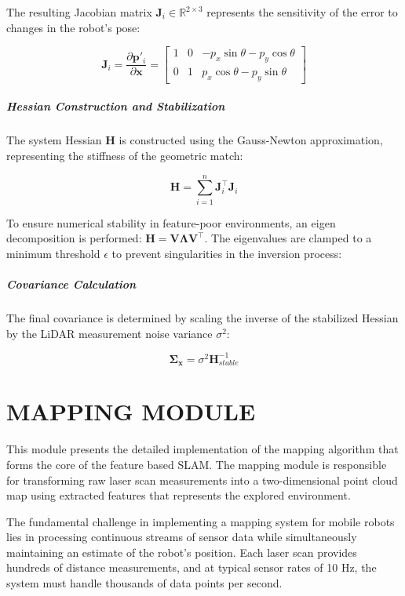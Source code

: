 \documentclass[11pt]{article}
\begin{document}
The resulting Jacobian matrix $\mathbf{J}_i \in \mathbb{R}^{2 \times 3}$ represents the sensitivity of the error to changes in the robot's pose:

\begin{equation}
	\mathbf{J}_i = \frac{\partial \mathbf{p}'_i}{\partial \mathbf{x}} = \begin{bmatrix} 1 & 0 & -p_x \sin \theta - p_y \cos \theta \\ 0 & 1 & p_x \cos \theta - p_y \sin \theta \end{bmatrix}
\end{equation}

\subparagraph{Hessian Construction and Stabilization}
The system Hessian $\mathbf{H}$ is constructed using the Gauss-Newton approximation, representing the stiffness of the geometric match:

\begin{equation}
	\mathbf{H} = \sum_{i=1}^{n} \mathbf{J}_i^\top \mathbf{J}_i
\end{equation}


To ensure numerical stability in feature-poor environments, an eigen decomposition is performed: $\mathbf{H} = \mathbf{V} \mathbf{\Lambda} \mathbf{V}^\top$. The eigenvalues are clamped to a minimum threshold $\epsilon$ to prevent singularities in the inversion process:

\subparagraph{Covariance Calculation}
The final covariance is determined by scaling the inverse of the stabilized Hessian by the LiDAR measurement noise variance $\sigma^2$:

\begin{equation}
	\mathbf{\Sigma}_{\mathbf{x}} = \sigma^2 \mathbf{H}_{stable}^{-1}
\end{equation}


\section{MAPPING MODULE}

This module presents the detailed implementation of the mapping algorithm that forms the core of the feature based SLAM. The mapping module is responsible for transforming raw laser scan measurements into a two-dimensional point cloud map using extracted features that represents the explored environment. 

The fundamental challenge in implementing a mapping system for mobile robots lies in processing continuous streams of sensor data while simultaneously maintaining an estimate of the robot's position. Each laser scan provides hundreds of distance measurements, and at typical sensor rates of 10 Hz, the system must handle thousands of data points per second. 
\end{document}
